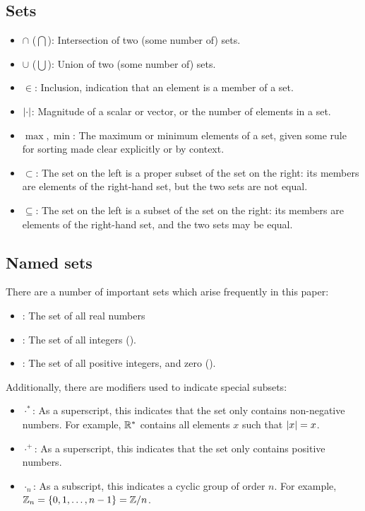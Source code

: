 \begin{appendix}
\subsection{Sets}
\begin{itemize}
\item $\cap$ ($\bigcap$): Intersection of two (some number of) sets.
\item $\cup$ ($\bigcup$): Union of two (some number of) sets.
\item $\in$: Inclusion, indication that an element is a member of a set.
\item $\left|\cdot\right|$: Magnitude of a scalar or vector, or the number of elements in a set.
\item $\max,\min$: The maximum or minimum elements of a set, given some rule for sorting made clear explicitly or by context.
\item $\subset$: The set on the left is a proper subset of the set on the right: its members are elements of the right-hand set, but the two sets are not equal.
\item $\subseteq$: The set on the left is a subset of the set on the right: its members are elements of the right-hand set, and the two sets may be equal.
\end{itemize}

\subsection{Named sets}
There are a number of important sets which arise frequently in this paper:
\begin{itemize}
\item \reals: The set of all real numbers
\item \integers: The set of all integers ().
\item \wholes: The set of all positive integers, and zero ().
\end{itemize}
Additionally, there are modifiers used to indicate special subsets:
\begin{itemize}
\item $\cdot^{*}$: As a superscript, this indicates that the set only contains non-negative numbers. For example, $\mathbb{R}^{*}$ contains all elements $x$ such that $\left|x\right|=x$.
\item $\cdot^{+}$: As a superscript, this indicates that the set only contains positive numbers. 
\item $\cdot_{n}$: As a subscript, this indicates a cyclic group of order $n$. For example, $\mathbb{Z}_{n}=\left\lbrace 0,1,\ldots,n-1 \right\rbrace=\mathbb{Z}/n$. 
\end{itemize}


\end{appendix}
